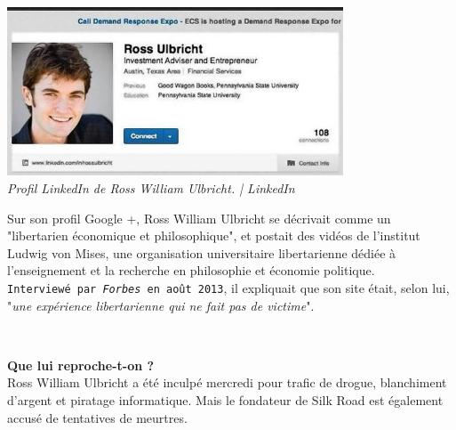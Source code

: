 \documentclass[11pt,twoside,a4paper]{article}
\begin{document}
\begin{minipage}[ht]{10.25cm}
	\includegraphics[width=10.00cm]{img/3489419_3_624f_profil-linkedin-de-ross-william-ulbricht_5e9a51b897c9680fb84211c1d0cc98b9.jpg} ~\\
	\emph{Profil LinkedIn de Ross William Ulbricht. | LinkedIn}~\\
\end{minipage} \hfill \begin{minipage}[ht]{9.00cm}
	Sur son profil Google +, Ross William Ulbricht se d{\'e}crivait comme un "libertarien {\'e}conomique et philosophique", et postait des vid{\'e}os de l'institut Ludwig von Mises, une organisation universitaire libertarienne d{\'e}di{\'e}e {\`a} l'enseignement et la recherche en philosophie et {\'e}conomie politique. ~\\ 

	\texttt{Interview{\'e} par \emph{Forbes} en ao{\^u}t 2013\footnotemark }, il expliquait que son site {\'e}tait, selon lui, "\emph{une exp{\'e}rience libertarienne qui ne fait pas de victime}". ~\\
\end{minipage} ~\\

	\textbf{Que lui reproche-t-on ?}~\\

Ross William Ulbricht a {\'e}t{\'e} inculp{\'e} mercredi pour trafic de drogue, blanchiment d'argent et piratage informatique. Mais le fondateur de Silk Road est {\'e}galement accus{\'e} de tentatives de meurtres. ~\\
\end{document}
